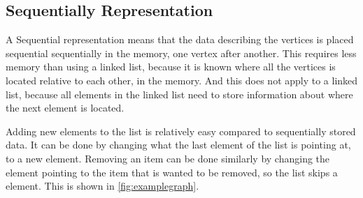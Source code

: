 \subsection{Sequentially Representation}
A Sequential representation means that the data describing the vertices is placed sequential sequentially in the memory, one vertex after another. 
This requires less memory than using a linked list, because it is known where all the vertices is located relative to each other, in the memory. And this does not apply to a linked list, because all elements in the linked list need to store information about where the next element is located.

Adding new elements to the list is relatively easy compared to sequentially stored data.
It can be done by changing what the last element of the list is pointing at, to a new element.
Removing an item can be done similarly by changing the element pointing to the item that is wanted to be removed, so the list skips a element. This is shown in \cref{fig:examplegraph}. %








